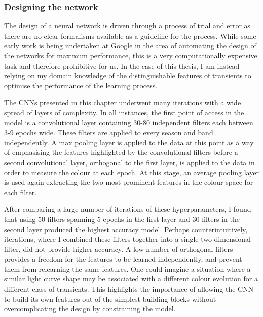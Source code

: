 \subsubsection{Designing the network} \label{sec:AGNNoiseModel}
The design of a neural network is driven through a process of trial and error as there are no clear formalisms available as a guideline for the process. While some early work is being  undertaken at Google in the area of automating the design of the networks for maximum performance, this is a very computationally expensive task and therefore prohibitive for us. In the case of this thesis, I am instead relying on my domain knowledge of the distinguishable features of transients to optimise the performance of the learning process.

The CNNs presented in this chapter underwent many iterations with a wide spread of layers of complexity. In all instances, the first point of access in the model is a convolutional layer containing 30-80 independent filters each between 3-9 epochs wide. These filters are applied to every season and band independently. A max pooling layer is applied to the data at this point as a way of emphasising the features highlighted by the convolutional filters before a second convolutional layer, orthogonal to the first layer, is applied to the data in order to measure the colour at each epoch. At this stage, an average pooling layer is used again extracting the two most prominent features in the colour space for each filter.

After comparing a large number of iterations of these hyperparameters, I found that using 50 filters spanning 5 epochs in the first layer and 30 filters in the second layer produced the highest accuracy model. Perhaps counterintuitively, iterations, where I combined these filters together into a single two-dimensional filter, did not provide higher accuracy. A low number of orthogonal filters provides a freedom for the features to be learned independently, and prevent them from relearning the same features. One could imagine a situation where a similar light curve shape may be associated with a different colour evolution for a different class of transients. This highlights the importance of allowing the CNN to build its own features out of the simplest building blocks without overcomplicating the design by constraining the model.

